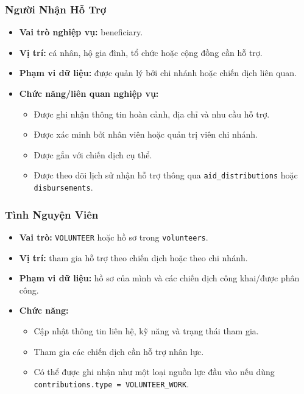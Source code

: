 \documentclass[12pt,a4paper]{article}
\begin{document}
\subsubsection{Người Nhận Hỗ Trợ}
\begin{itemize}
\item \textbf{Vai trò nghiệp vụ:} beneficiary.
\item \textbf{Vị trí:} cá nhân, hộ gia đình, tổ chức hoặc cộng đồng cần hỗ trợ.
\item \textbf{Phạm vi dữ liệu:} được quản lý bởi chi nhánh hoặc chiến dịch liên quan.
\item \textbf{Chức năng/liên quan nghiệp vụ:}
\begin{itemize}
\item Được ghi nhận thông tin hoàn cảnh, địa chỉ và nhu cầu hỗ trợ.
\item Được xác minh bởi nhân viên hoặc quản trị viên chi nhánh.
\item Được gắn với chiến dịch cụ thể.
\item Được theo dõi lịch sử nhận hỗ trợ thông qua \texttt{aid\_distributions} hoặc \texttt{disbursements}.
\end{itemize}
\end{itemize}
\subsubsection{Tình Nguyện Viên}
\begin{itemize}
\item \textbf{Vai trò:} \texttt{VOLUNTEER} hoặc hồ sơ trong \texttt{volunteers}.
\item \textbf{Vị trí:} tham gia hỗ trợ theo chiến dịch hoặc theo chi nhánh.
\item \textbf{Phạm vi dữ liệu:} hồ sơ của mình và các chiến dịch công khai/được phân công.
\item \textbf{Chức năng:}
\begin{itemize}
\item Cập nhật thông tin liên hệ, kỹ năng và trạng thái tham gia.
\item Tham gia các chiến dịch cần hỗ trợ nhân lực.
\item Có thể được ghi nhận như một loại nguồn lực đầu vào nếu dùng \texttt{contributions.type = VOLUNTEER\_WORK}.
\end{itemize}
\end{itemize}
\end{document}
